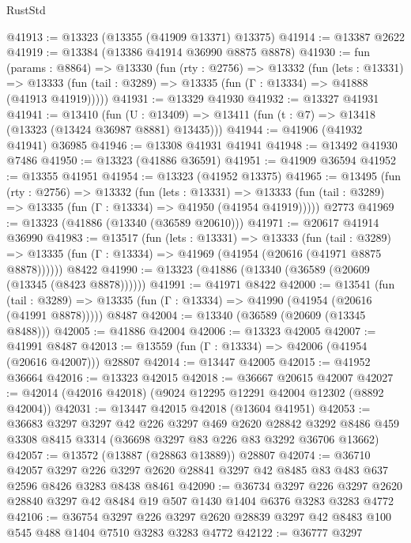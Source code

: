 \begin{lexlean}{RustStd}
\begin{coremodule}
@41913 := @13323 (@13355 (@41909 @13371) @13375)
@41914 := @13387 @2622
@41919 := @13384 (@13386 @41914 @36990 @8875 @8878)
@41930 := fun (params : @8864) =>
  @13330
    (fun (rty : @2756) =>
    @13332
      (fun (lets : @13331) =>
      @13333 (fun (tail : @3289) => @13335 (fun (Γ : @13334) => @41888 (@41913 @41919)))))
@41931 := @13329 @41930
@41932 := @13327 @41931
@41941 := @13410
    (fun (U : @13409) => @13411 (fun (t : @7) => @13418 (@13323 (@13424 @36987 @8881) @13435)))
@41944 := @41906 (@41932 @41941) @36985
@41946 := @13308 @41931 @41941
@41948 := @13492 @41930 @7486
@41950 := @13323 (@41886 @36591)
@41951 := @41909 @36594
@41952 := @13355 @41951
@41954 := @13323 (@41952 @13375)
@41965 := @13495
    (fun (rty : @2756) =>
    @13332
      (fun (lets : @13331) =>
      @13333 (fun (tail : @3289) => @13335 (fun (Γ : @13334) => @41950 (@41954 @41919)))))
    @2773
@41969 := @13323 (@41886 (@13340 (@36589 @20610)))
@41971 := @20617 @41914 @36990
@41983 := @13517
    (fun (lets : @13331) =>
    @13333
      (fun (tail : @3289) =>
      @13335 (fun (Γ : @13334) => @41969 (@41954 (@20616 (@41971 @8875 @8878))))))
    @8422
@41990 := @13323 (@41886 (@13340 (@36589 (@20609 (@13345 (@8423 @8878))))))
@41991 := @41971 @8422
@42000 := @13541
    (fun (tail : @3289) => @13335 (fun (Γ : @13334) => @41990 (@41954 (@20616 (@41991 @8878)))))
    @8487
@42004 := @13340 (@36589 (@20609 (@13345 @8488)))
@42005 := @41886 @42004
@42006 := @13323 @42005
@42007 := @41991 @8487
@42013 := @13559 (fun (Γ : @13334) => @42006 (@41954 (@20616 @42007))) @28807
@42014 := @13447 @42005
@42015 := @41952 @36664
@42016 := @13323 @42015
@42018 := @36667 @20615 @42007
@42027 := @42014 (@42016 @42018) (@9024 @12295 @12291 @42004 @12302 (@8892 @42004))
@42031 := @13447 @42015 @42018 (@13604 @41951)
@42053 := @36683
    @3297
    @3297
    @42
    @226
    @3297
    @469
    @2620
    @28842
    @3292
    @8486
    @459
    @3308
    @8415
    @3314
    (@36698 @3297 @83 @226 @83 @3292 @36706 @13662)
@42057 := @13572 (@13887 (@28863 @13889)) @28807
@42074 := @36710
    @42057
    @3297
    @226
    @3297
    @2620
    @28841
    @3297
    @42
    @8485
    @83
    @483
    @637
    @2596
    @8426
    @3283
    @8438
    @8461
@42090 := @36734
    @3297
    @226
    @3297
    @2620
    @28840
    @3297
    @42
    @8484
    @19
    @507
    @1430
    @1404
    @6376
    @3283
    @3283
    @4772
@42106 := @36754
    @3297
    @226
    @3297
    @2620
    @28839
    @3297
    @42
    @8483
    @100
    @545
    @488
    @1404
    @7510
    @3283
    @3283
    @4772
@42122 := @36777
    @3297

\end{coremodule}
\end{lexlean}
